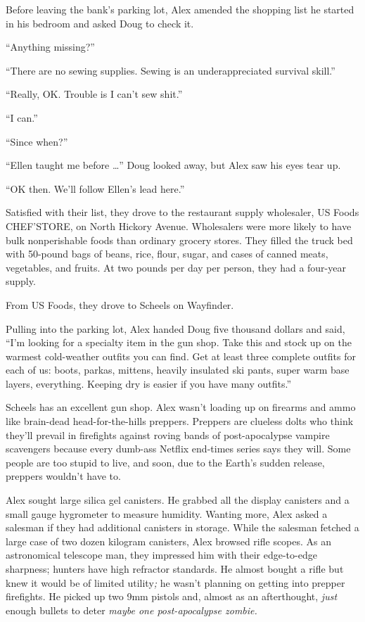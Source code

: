 Before leaving the bank's parking lot, Alex amended the shopping list he
started in his bedroom and asked Doug to check it.

``Anything missing?''

``There are no sewing supplies. Sewing is an underappreciated survival
skill.''

``Really, OK. Trouble is I can't sew shit.''

``I can.''

``Since when?''

``Ellen taught me before \ldots'' Doug looked away, but Alex saw his
eyes tear up.

``OK then. We'll follow Ellen's lead here.''

Satisfied with their list, they drove to the restaurant supply
wholesaler, US Foods CHEF'STORE, on North Hickory Avenue. Wholesalers
were more likely to have bulk nonperishable foods than ordinary grocery
stores. They filled the truck bed with 50-pound bags of beans, rice,
flour, sugar, and cases of canned meats, vegetables, and fruits. At two
pounds per day per person, they had a four-year supply.

From US Foods, they drove to Scheels on Wayfinder.

Pulling into the parking lot, Alex handed Doug five thousand dollars and
said, ``I'm looking for a specialty item in the gun shop. Take this and
stock up on the warmest cold-weather outfits you can find. Get at least
three complete outfits for each of us: boots, parkas, mittens, heavily
insulated ski pants, super warm base layers, everything. Keeping dry is
easier if you have many outfits.''

Scheels has an excellent gun shop. Alex wasn't loading up on firearms
and ammo like brain-dead head-for-the-hills preppers. Preppers are
clueless dolts who think they'll prevail in firefights against roving
bands of post-apocalypse vampire scavengers because every dumb-ass
Netflix end-times series says they will. Some people are too stupid to
live, and soon, due to the Earth's sudden release, preppers wouldn't
have to.

Alex sought large silica gel canisters. He grabbed all the display
canisters and a small gauge hygrometer to measure humidity. Wanting
more, Alex asked a salesman if they had additional canisters in storage.
While the salesman fetched a large case of two dozen kilogram canisters,
Alex browsed rifle scopes. As an astronomical telescope man, they
impressed him with their edge-to-edge sharpness; hunters have high
refractor standards. He almost bought a rifle but knew it would be of
limited utility\emph{;} he wasn't planning on getting into prepper
firefights. He picked up two 9mm pistols and, almost as an afterthought,
\emph{just} enough bullets to deter \emph{maybe one post-apocalypse
zombie.}

